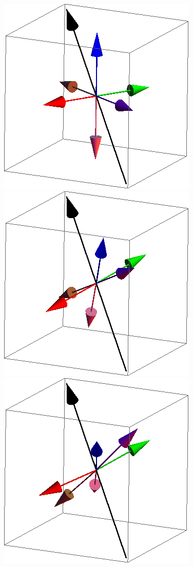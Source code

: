 \documentclass{article}
\begin{document}
\begin{figure}[ht]
\centering
\includegraphics[scale=0.27]{1S000to005R.png}
\includegraphics[scale=0.27]{2S000to005R.png}
\includegraphics[scale=0.27]{3S000to005R.png}

\end{figure}
\end{document}
